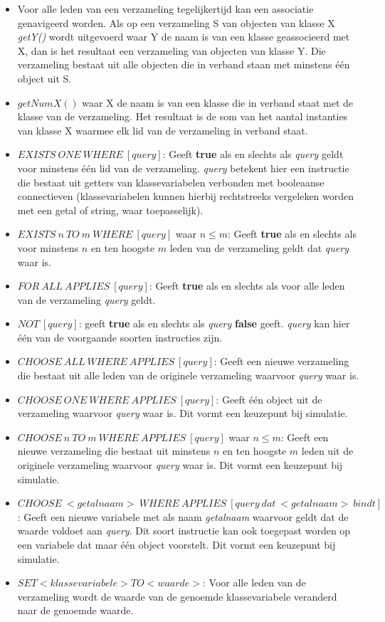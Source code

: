 \begin{itemize}
	\item Voor alle leden van een verzameling tegelijkertijd kan een associatie genavigeerd worden. Als op een verzameling S van objecten van klasse X \textit{getY()} wordt uitgevoerd waar Y de naam is van een klasse geassocieerd met X, dan is het resultaat een verzameling van objecten van klasse Y. Die verzameling bestaat uit alle objecten die in verband staan met minstens \'e\'en object uit S.
	\item $getNumX()$ waar X de naam is van een klasse die in verband staat met de klasse van de verzameling. Het resultaat is de som van het aantal instanties van klasse X waarmee elk lid van de verzameling in verband staat.
	\item $EXISTS\ ONE\ WHERE\ [query]$: Geeft \textbf{true} als en slechts als \textit{query} geldt voor minstens \'e\'en lid van de verzameling. \textit{query} betekent hier een instructie die bestaat uit getters van klassevariabelen verbonden met booleaanse connectieven (klassevariabelen kunnen hierbij rechtstreeks vergeleken worden met een getal of string, waar toepasselijk).
	\item $EXISTS\ n\ TO\ m\ WHERE\ [query]$ waar $n \leq m$: Geeft \textbf{true} als en slechts als voor minstens $n$ en ten hoogste $m$ leden van de verzameling geldt dat \textit{query} waar is.
	\item $FOR\ ALL\ APPLIES\ [query]$: Geeft \textbf{true} als en slechts als voor alle leden van de verzameling \textit{query} geldt.
	\item $NOT\ [query]$: geeft \textbf{true} als en slechts als \textit{query} \textbf{false} geeft. \textit{query} kan hier \'e\'en van de voorgaande soorten instructies zijn.
	\item $CHOOSE\ ALL\ WHERE\ APPLIES\ [query]$: Geeft een nieuwe verzameling die bestaat uit alle leden van de originele verzameling waarvoor \textit{query} waar is.
	\item $CHOOSE\ ONE\ WHERE\ APPLIES\ [query]$: Geeft \'e\'en object uit de verzameling waarvoor \textit{query} waar is. Dit vormt een keuzepunt bij simulatie.
	\item $CHOOSE\ n\ TO\ m\ WHERE\ APPLIES\ [query]$ waar $n \leq m$: Geeft een nieuwe verzameling die bestaat uit minstens $n$ en ten hoogste $m$ leden uit de originele verzameling waarvoor \textit{query} waar is. Dit vormt een keuzepunt bij simulatie.
	\item $CHOOSE\ <getalnaam>\ WHERE\ APPLIES\ [query\ dat\ <getalnaam>\ bindt]$: Geeft een nieuwe variabele met als naam \textit{getalnaam} waarvoor geldt dat de waarde voldoet aan \textit{query}. Dit soort instructie kan ook toegepast worden op een variabele dat maar \'e\'en object voorstelt. Dit vormt een keuzepunt bij simulatie.
	\item $SET <klassevariabele> TO <waarde>$: Voor alle leden van de verzameling wordt de waarde van de genoemde klassevariabele veranderd naar de genoemde waarde.
\end{itemize}


